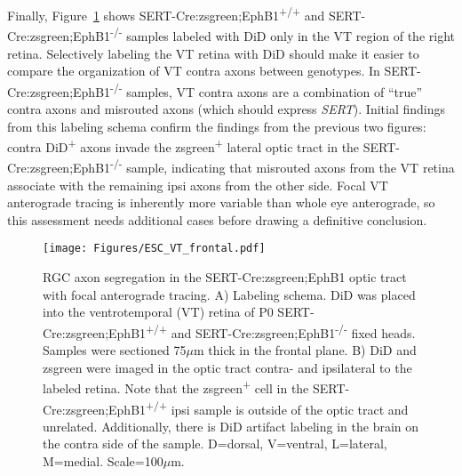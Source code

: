 Finally, Figure~\ref{ESCVTfrontal} shows SERT-Cre:zsgreen;EphB1\textsuperscript{+/+} and SERT-Cre:zsgreen;EphB1\textsuperscript{-/-} samples labeled with DiD only in the VT region of the right retina.
Selectively labeling the VT retina with DiD should make it easier to compare the organization of VT contra axons between genotypes.
In SERT-Cre:zsgreen;EphB1\textsuperscript{-/-} samples, VT contra axons are a combination of ``true'' contra axons and misrouted axons (which should express \emph{SERT}).
Initial findings from this labeling schema confirm the findings from the previous two figures: contra DiD\textsuperscript{+} axons invade the zsgreen\textsuperscript{+} lateral optic tract in the SERT-Cre:zsgreen;EphB1\textsuperscript{-/-} sample, indicating that misrouted axons from the VT retina associate with the remaining ipsi axons from the other side.
Focal VT anterograde tracing is inherently more variable than whole eye anterograde, so this assessment needs additional cases before drawing a definitive conclusion.
\begin{figure}[hbtp]
    \begin{center}
        \texttt{[image: Figures/ESC\_VT\_frontal.pdf]}
        \caption[RGC axon segregation in the SERT-Cre:zsgreen;EphB1 optic tract with focal anterograde tracing.]
        {RGC axon segregation in the SERT-Cre:zsgreen;EphB1 optic tract with focal anterograde tracing.
        A) Labeling schema.
        DiD was placed into the ventrotemporal (VT) retina of P0 SERT-Cre:zsgreen;EphB1\textsuperscript{+/+} and SERT-Cre:zsgreen;EphB1\textsuperscript{-/-} fixed heads.
        Samples were sectioned 75$\mu$m thick in the frontal plane.
        B) DiD and zsgreen were imaged in the optic tract contra- and ipsilateral to the labeled retina.
        Note that the zsgreen\textsuperscript{+} cell in the SERT-Cre:zsgreen;EphB1\textsuperscript{+/+} ipsi sample is outside of the optic tract and unrelated.
        Additionally, there is DiD artifact labeling in the brain on the contra side of the sample.
        D=dorsal, V=ventral, L=lateral, M=medial.
        Scale=100$\mu$m.}
        \label{ESCVTfrontal}
    \end{center}
\end{figure}
